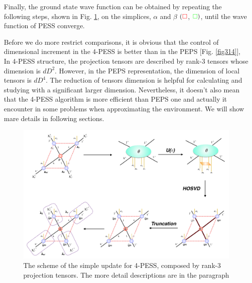 Finally, the ground state wave function can be obtained by repeating the following steps, shown in Fig. \ref{fig4326}, on the simplices, $\alpha$ and $\beta$ $( \color{red} \square$, ${\color{green} \square})$, until the wave function of PESS converge.

Before we do more restrict comparisons, it is obvious that the control of dimensional increment in the 4-PESS is better than in the PEPS [Fig. \ref{fig314}], In 4-PESS structure, the projection tensors are described by rank-3 tensors whose dimension is $dD^2$. However, in the PEPS representation, the dimension of local tensors is $dD^4$. The reduction of tensors dimension is helpful for calculating and studying with a significant larger dimension. Nevertheless, it doesn't also mean that the 4-PESS algorithm is more efficient than PEPS one and actually it encounter in some problems when approximating the environment. We will show mare details in following sections.

\begin{figure}[ht]
	\centering
	\includegraphics[width=1.00\textwidth]{figures/fig4326.png}
	\caption[The scheme of the simple update for 4-PESS, composed by rank-3 projection tensors.]{The scheme of the simple update for 4-PESS, composed by rank-3 projection tensors. The more detail descriptions are in the paragraph}
	\label{fig4326}
\end{figure}
